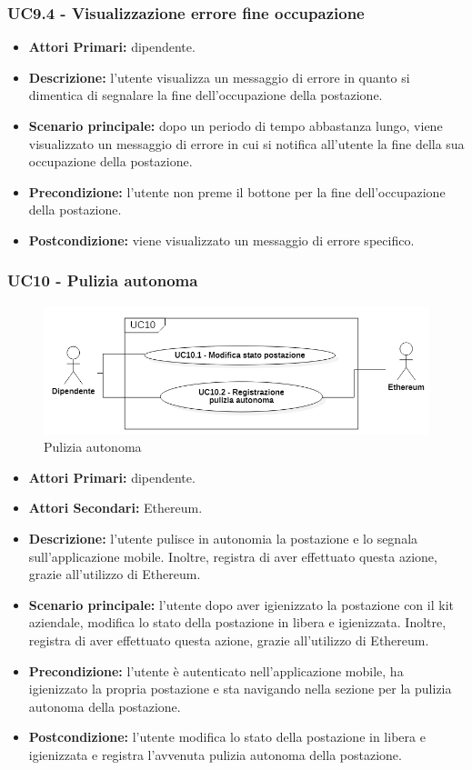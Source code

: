 \subsubsection{ UC9.4 - Visualizzazione errore fine occupazione}
\begin{itemize}
	\item\textbf{Attori Primari:} dipendente.
	\item\textbf{Descrizione:} l’utente visualizza un messaggio di errore in quanto si dimentica di segnalare la fine dell'occupazione della postazione.
	\item\textbf{Scenario principale:} dopo un periodo di tempo abbastanza lungo, viene visualizzato un messaggio di errore in cui si notifica
	all'utente la fine della sua occupazione della postazione.
	\item\textbf{Precondizione:} l’utente non preme il bottone per la fine dell'occupazione della postazione.
	\item\textbf{Postcondizione:} viene visualizzato un messaggio di errore specifico.
\end{itemize}
\subsubsection{ UC10 - Pulizia autonoma}
\begin{figure}[H]
	\centering
	\includegraphics[width=15cm]{res/images/UC10.png}
	\caption{Pulizia autonoma}
	\label{fig:Pulizia autonoma}
\end{figure}
\begin{itemize}
	\item\textbf{Attori Primari:} dipendente.
	\item\textbf{Attori Secondari:} Ethereum.
	\item\textbf{Descrizione:} l’utente pulisce in autonomia la postazione e lo segnala sull'applicazione mobile. Inoltre, 
	registra di aver effettuato questa azione, grazie all'utilizzo di Ethereum.	\item\textbf{Scenario principale:} l’utente dopo aver igienizzato la postazione con il kit aziendale, modifica lo stato della postazione in libera e igienizzata. Inoltre, 
	registra di aver effettuato questa azione, grazie all'utilizzo di Ethereum.
	\item\textbf{Precondizione:} l’utente è autenticato nell'applicazione mobile, ha igienizzato la propria postazione e sta navigando nella sezione per la pulizia 
	autonoma della postazione.
	\item\textbf{Postcondizione:} l’utente modifica lo stato della postazione in libera e igienizzata e registra l'avvenuta pulizia autonoma della postazione.
\end{itemize}
